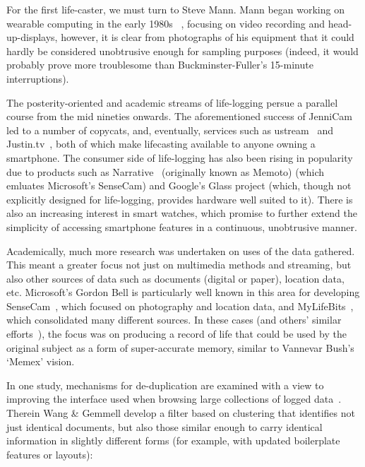 For the first life-caster, we must turn to Steve Mann.  Mann began working on wearable computing in the early 1980s~\cite{mann1994wearable} , focusing on video recording and head-up-displays, however, it is clear from photographs of his equipment that it could hardly be considered unobtrusive enough for sampling purposes (indeed, it would probably prove more troublesome than Buckminster-Fuller's 15-minute interruptions).

The posterity-oriented and academic streams of life-logging persue a parallel course from the mid nineties onwards.  The aforementioned success of JenniCam led to a number of copycats, and, eventually, services such as ustream~\cite{ustream2014homepage} and Justin.tv~\cite{justintv2014homepage}, both of which make lifecasting available to anyone owning a smartphone.  The consumer side of life-logging has also been rising in popularity due to products such as Narrative~\cite{narrative2014lifelog} (originally known as Memoto) (which emluates Microsoft's SenseCam) and Google's Glass project (which, though not explicitly designed for life-logging, provides hardware well suited to it).  There is also an increasing interest in smart watches, which promise to further extend the simplicity of accessing smartphone features in a continuous, unobtrusive manner.

Academically, much more research was undertaken on uses of the data gathered.  This meant a greater focus not just on multimedia methods and streaming, but also other sources of data such as documents (digital or paper), location data, etc.  Microsoft's Gordon Bell is particularly well known in this area for developing SenseCam~\cite{hodges2006sensecam}, which focused on photography and location data, and MyLifeBits~\cite{gemmell2002mylifebits,gemmell2006mylifebits}, which consolidated many different sources.  In these cases (and others' similar efforts~\cite{huynh2002haystack,dumais2003stuff,dittrich2006imemex}), the focus was on producing a record of life that could be used by the original subject as a form of super-accurate memory, similar to Vannevar Bush's `Memex' vision\cite{bush1945we}.

In one study, mechanisms for de-duplication are examined with a view to improving the interface used when browsing large collections of logged data~\cite{gemmell2006clean}.  Therein Wang \& Gemmell develop a filter based on clustering that identifies not just identical documents, but also those similar enough to carry identical information in slightly different forms (for example, with updated boilerplate features or layouts):

